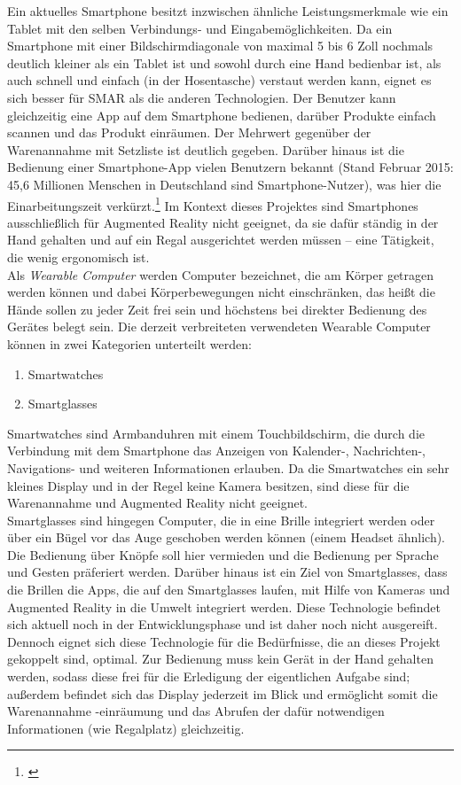 Ein aktuelles Smartphone besitzt inzwischen ähnliche Leistungsmerkmale wie ein Tablet mit den selben Verbindungs- und Eingabemöglichkeiten. Da ein Smartphone mit einer Bildschirmdiagonale von maximal 5 bis 6 Zoll nochmals deutlich kleiner als ein Tablet ist und sowohl durch eine Hand bedienbar ist, als auch schnell und einfach (\zB in der Hosentasche) verstaut werden kann, eignet es sich besser für \acs{SMAR} als die anderen Technologien. Der Benutzer kann gleichzeitig eine App auf dem Smartphone bedienen, darüber Produkte einfach scannen und das Produkt einräumen. Der Mehrwert gegenüber der Warenannahme mit Setzliste ist deutlich gegeben. Darüber hinaus ist die Bedienung einer Smartphone-App vielen Benutzern bekannt (Stand Februar 2015: 45,6 Millionen Menschen in Deutschland sind Smartphone-Nutzer), was hier die Einarbeitungszeit verkürzt.\footnote{\citep{statista_smartphone}} Im Kontext dieses Projektes sind Smartphones ausschließlich für Augmented Reality nicht geeignet, da sie dafür ständig in der Hand gehalten und auf ein Regal ausgerichtet werden müssen -- eine Tätigkeit, die wenig ergonomisch ist.\\

Als \emph{Wearable Computer} werden Computer bezeichnet, die am Körper getragen werden können und dabei Körperbewegungen nicht einschränken, das heißt die Hände sollen zu jeder Zeit frei sein und höchstens bei direkter Bedienung des Gerätes belegt sein. Die derzeit verbreiteten \bzw verwendeten Wearable Computer können in zwei Kategorien unterteilt werden:
\begin{enumerate}
	\item Smartwatches
	\item Smartglasses
\end{enumerate}
Smartwatches sind Armbanduhren mit einem Touchbildschirm, die durch die Verbindung mit dem Smartphone das Anzeigen von Kalender-, Nachrichten-, Navigations- und weiteren Informationen erlauben. Da die Smartwatches ein sehr kleines Display und in der Regel keine Kamera besitzen, sind diese für die Warenannahme und Augmented Reality nicht geeignet.\\
Smartglasses sind hingegen Computer, die in eine Brille integriert werden oder über ein Bügel vor das Auge geschoben werden können (einem Headset ähnlich). Die Bedienung über Knöpfe soll hier vermieden und die Bedienung per Sprache und Gesten präferiert werden. Darüber hinaus ist ein Ziel von Smartglasses, dass die Brillen \bzw die Apps, die auf den Smartglasses laufen, mit Hilfe von Kameras und Augmented Reality in die Umwelt integriert werden. Diese Technologie befindet sich aktuell noch in der Entwicklungsphase und ist daher noch nicht ausgereift. Dennoch eignet sich diese Technologie für die Bedürfnisse, die an dieses Projekt gekoppelt sind, optimal. Zur Bedienung muss kein Gerät in der Hand gehalten werden, sodass diese frei für die Erledigung der eigentlichen Aufgabe sind; außerdem befindet sich das Display jederzeit im Blick und ermöglicht somit die Warenannahme \bzw -einräumung und das Abrufen der dafür notwendigen Informationen (wie \zB Regalplatz) gleichzeitig.\\

